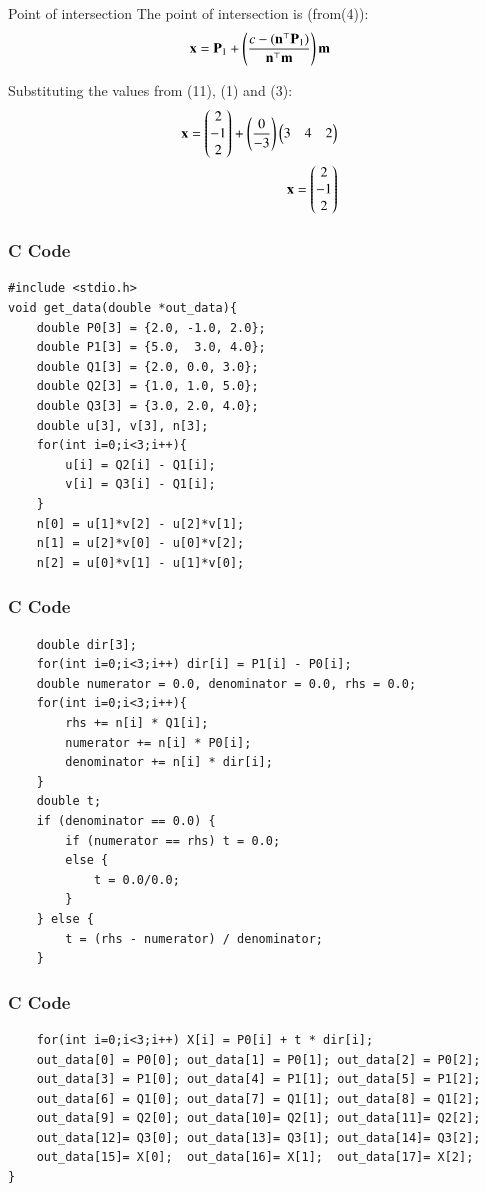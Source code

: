 \documentclass{beamer}
\begin{document}
\begin{frame}{Point of intersection}
The point of intersection is (from(4)):
\begin{align}
    \mathbf{x}=\mathbf{P}_1+\left(\frac{c-(\mathbf{n}^\top\mathbf{P}_1)}{\mathbf{n}^\top\mathbf{m}}\right)\mathbf{m}
\end{align}

Substituting the values from (11), (1) and (3):
\begin{align}
    \mathbf{x}=\begin{pmatrix}2\\-1\\2\end{pmatrix}+\left(\frac{0}{-3}\right)\begin{pmatrix}3&4&2\end{pmatrix}\\
    \mathbf{x}=\begin{pmatrix}2\\-1\\2\end{pmatrix}
\end{align}
\end{frame}


\begin{frame}[fragile]
    \frametitle{C Code}
    \begin{lstlisting}
#include <stdio.h>
void get_data(double *out_data){
    double P0[3] = {2.0, -1.0, 2.0};
    double P1[3] = {5.0,  3.0, 4.0};
    double Q1[3] = {2.0, 0.0, 3.0};
    double Q2[3] = {1.0, 1.0, 5.0};
    double Q3[3] = {3.0, 2.0, 4.0};
    double u[3], v[3], n[3];
    for(int i=0;i<3;i++){
        u[i] = Q2[i] - Q1[i];
        v[i] = Q3[i] - Q1[i];
    }
    n[0] = u[1]*v[2] - u[2]*v[1];
    n[1] = u[2]*v[0] - u[0]*v[2];
    n[2] = u[0]*v[1] - u[1]*v[0];
    \end{lstlisting}
\end{frame}

\begin{frame}[fragile]
    \frametitle{C Code}
    \begin{lstlisting}
    double dir[3];
    for(int i=0;i<3;i++) dir[i] = P1[i] - P0[i];
    double numerator = 0.0, denominator = 0.0, rhs = 0.0;
    for(int i=0;i<3;i++){
        rhs += n[i] * Q1[i];
        numerator += n[i] * P0[i];
        denominator += n[i] * dir[i];
    }
    double t;
    if (denominator == 0.0) {
        if (numerator == rhs) t = 0.0;
        else {
            t = 0.0/0.0;
        }
    } else {
        t = (rhs - numerator) / denominator;
    }
    \end{lstlisting}
\end{frame}

\begin{frame}[fragile]
    \frametitle{C Code}
    \begin{lstlisting}
    for(int i=0;i<3;i++) X[i] = P0[i] + t * dir[i];
    out_data[0] = P0[0]; out_data[1] = P0[1]; out_data[2] = P0[2];
    out_data[3] = P1[0]; out_data[4] = P1[1]; out_data[5] = P1[2];
    out_data[6] = Q1[0]; out_data[7] = Q1[1]; out_data[8] = Q1[2];
    out_data[9] = Q2[0]; out_data[10]= Q2[1]; out_data[11]= Q2[2];
    out_data[12]= Q3[0]; out_data[13]= Q3[1]; out_data[14]= Q3[2];
    out_data[15]= X[0];  out_data[16]= X[1];  out_data[17]= X[2];
}
    \end{lstlisting}
\end{frame}
\end{document}

